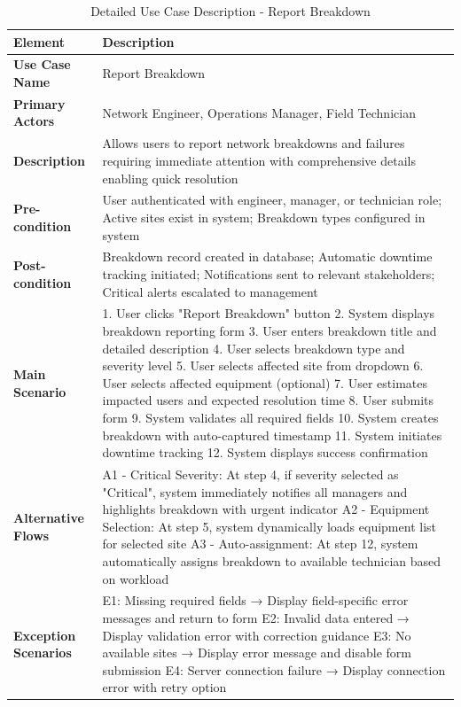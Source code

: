 \begin{table}[H]
\centering
\small
\begin{tabular}{|p{3cm}|p{8.5cm}|}
\hline
\textbf{Element} & \textbf{Description} \\
\hline
\textbf{Use Case Name} & Report Breakdown \\
\hline
\textbf{Primary Actors} & Network Engineer, Operations Manager, Field Technician \\
\hline
\textbf{Description} & Allows users to report network breakdowns and failures requiring immediate attention with comprehensive details enabling quick resolution \\
\hline
\textbf{Pre-condition} & User authenticated with engineer, manager, or technician role; Active sites exist in system; Breakdown types configured in system \\
\hline
\textbf{Post-condition} & Breakdown record created in database; Automatic downtime tracking initiated; Notifications sent to relevant stakeholders; Critical alerts escalated to management \\
\hline
\textbf{Main Scenario} & 
1. User clicks "Report Breakdown" button
2. System displays breakdown reporting form
3. User enters breakdown title and detailed description
4. User selects breakdown type and severity level
5. User selects affected site from dropdown
6. User selects affected equipment (optional)
7. User estimates impacted users and expected resolution time
8. User submits form
9. System validates all required fields
10. System creates breakdown with auto-captured timestamp
11. System initiates downtime tracking
12. System displays success confirmation
\\
\hline
\textbf{Alternative Flows} & 
A1 - Critical Severity: At step 4, if severity selected as "Critical", system immediately notifies all managers and highlights breakdown with urgent indicator
A2 - Equipment Selection: At step 5, system dynamically loads equipment list for selected site
A3 - Auto-assignment: At step 12, system automatically assigns breakdown to available technician based on workload
\\
\hline
\textbf{Exception Scenarios} & 
E1: Missing required fields → Display field-specific error messages and return to form
E2: Invalid data entered → Display validation error with correction guidance
E3: No available sites → Display error message and disable form submission
E4: Server connection failure → Display connection error with retry option
\\
\hline
\end{tabular}
\caption{Detailed Use Case Description - Report Breakdown}
\label{tab:report_breakdown_usecase}
\end{table}

